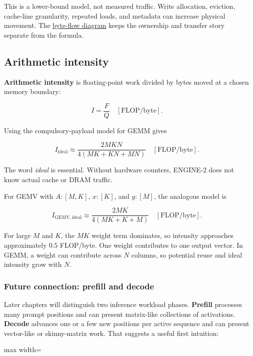 \documentclass[
  10pt,
]{article}
\begin{document}
This is a lower-bound model, not measured traffic. Write allocation,
eviction, cache-line granularity, repeated loads, and metadata can
increase physical movement. The
\href{https://github.com/hermonai/inside-the-llm-engine/blob/astra-visual-rewrite/diagrams/linear/follow-the-byte.txt}{byte-flow
diagram} keeps the ownership and transfer story separate from the
formula.

\subsection{Arithmetic intensity}\label{arithmetic-intensity}

\textbf{Arithmetic intensity} is floating-point work divided by bytes
moved at a chosen memory boundary:

\[
I=\frac{F}{Q}\quad[\mathrm{FLOP/byte}].
\]

Using the compulsory-payload model for GEMM gives

\[
I_{\mathrm{ideal}}
\approx\frac{2MKN}{4(MK+KN+MN)}\quad[\mathrm{FLOP/byte}].
\]

The word \emph{ideal} is essential. Without hardware counters, ENGINE-2
does not know actual cache or DRAM traffic.

For GEMV with \(A:[M,K]\), \(x:[K]\), and \(y:[M]\), the analogous model
is

\[
I_{\mathrm{GEMV,ideal}}
\approx\frac{2MK}{4(MK+K+M)}\quad[\mathrm{FLOP/byte}].
\]

For large \(M\) and \(K\), the \(MK\) weight term dominates, so
intensity approaches approximately \(0.5\) FLOP/byte. One weight
contributes to one output vector. In GEMM, a weight can contribute
across \(N\) columns, so potential reuse and ideal intensity grow with
\(N\).

\subsubsection{Future connection: prefill and
decode}\label{future-connection-prefill-and-decode}

Later chapters will distinguish two inference workload phases.
\textbf{Prefill} processes many prompt positions and can present
matrix-like collections of activations. \textbf{Decode} advances one or
a few new positions per active sequence and can present vector-like or
skinny-matrix work. That suggests a useful first intuition:

\begin{center}\begin{adjustbox}{max width=\linewidth}\end{adjustbox}\end{center}
\end{document}
